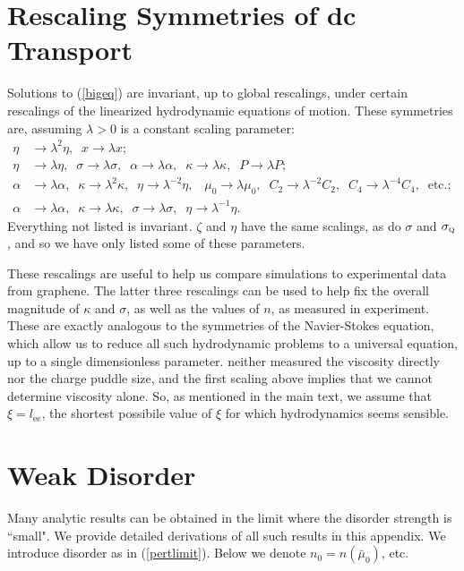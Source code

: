 \documentclass[10pt, oneside]{book}
\begin{document}
\begin{doublespace}
\begin{appendix}
\section{Rescaling Symmetries of dc Transport}\label{apprescale}
Solutions to (\ref{bigeq}) are invariant, up to global rescalings, under certain rescalings of the linearized hydrodynamic equations of motion.   These symmetries are, assuming $\lambda>0$ is a constant scaling parameter:  
\begin{subequations}\begin{align}
\eta &\rightarrow \lambda^2 \eta, \;\; x \rightarrow \lambda x; \\
\eta &\rightarrow \lambda \eta, \;\; \sigma \rightarrow \lambda \sigma, \;\; \alpha \rightarrow \lambda\alpha, \;\; \kappa \rightarrow \lambda\kappa, \;\; P \rightarrow \lambda P; \\
\alpha &\rightarrow \lambda \alpha, \;\; \kappa \rightarrow \lambda^{2}\kappa, \;\; \eta \rightarrow \lambda^{-2} \eta, \;\;\; \mu_0 \rightarrow \lambda \mu_0, \;\; C_2 \rightarrow \lambda^{-2}C_2,\;\; C_4 \rightarrow \lambda^{-4}C_4,\;\; \mathrm{etc.}; \\
\alpha &\rightarrow \lambda \alpha, \;\; \kappa \rightarrow \lambda\kappa, \;\; \sigma \rightarrow \lambda\sigma, \;\; \eta \rightarrow \lambda^{-1} \eta.
\end{align}\end{subequations}
Everything not listed is invariant.  $\zeta$ and $\eta$ have the same scalings, as do $\sigma$ and $\sigma_{\textsc{q}}$, and so we have only listed some of these parameters.     

These rescalings are useful to help us compare simulations to experimental data from graphene.  The latter three rescalings can be used to help fix the overall magnitude of $\kappa$ and $\sigma$, as well as the values of $n$, as measured in experiment.    These are exactly analogous to the symmetries of the Navier-Stokes equation, which allow us to reduce all such hydrodynamic problems to a universal equation, up to a single dimensionless parameter.   \cite{Crossno1058} neither measured the viscosity directly nor the charge puddle size, and the first scaling above implies that we cannot determine viscosity alone.  So, as mentioned in the main text, we assume that $\xi = l_{\mathrm{ee}}$,  the shortest possibile value of $\xi$ for which hydrodynamics seems sensible.   

\section{Weak Disorder}\label{appmom}
Many analytic results can be obtained in the limit where the disorder strength is ``small".   We provide detailed derivations of all such results in this appendix.    We introduce disorder as in (\ref{pertlimit}).    Below we denote $n_0 = n(\bar\mu_0)$, etc.


\end{appendix}
\end{doublespace}
\end{document}
